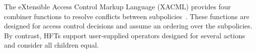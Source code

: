 {\color{red}

}

%


The eXtensible Access Control Markup Language (XACML) provides
four combiner functions to resolve conflicts between subpolicies~\cite{gm:xacml-1.1}.
These functions are designed for access control decisions and assume an ordering
over the subpolicies. %
By contrast, HFTs support user-supplied operators designed for several actions
and consider all children equal.
